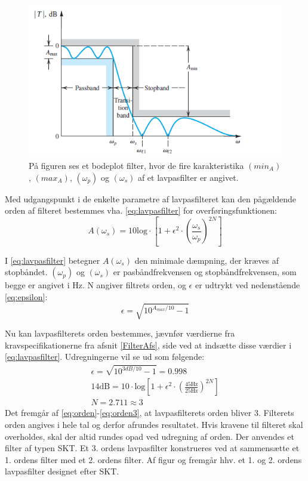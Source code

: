 \begin{figure}[H]
	\centering
	\includegraphics[scale=1]{figures/cProblemloesning/Lavpasfilter_generisk.PNG}
	\caption{På figuren ses et bodeplot filter, hvor de fire karakteristika $(min_{A})$, $(max_{A})$, $(\omega_p)$ og $(\omega_s)$ af et lavpasfilter er angivet. \cite{Carter2013}}
	\label{fig:Lavpasfilter_generisk}
\end{figure}
\noindent Med udgangspunkt i de enkelte parametre af lavpasfilteret kan den pågældende orden af filteret bestemmes vha. \eqref{eq:lavpasfilter} for overføringsfunktionen:
\begin{equation} \label{eq:lavpasfilter}
A(\omega_s) = 10 \text{log} \cdot \left[1 + \epsilon^2 \cdot (\frac{\omega _s}{\omega _p})^{2N}\right] 
\end{equation}

\noindent I \eqref{eq:lavpasfilter} betegner $A(\omega _s)$ den minimale dæmpning, der kræves af stopbåndet. $(\omega_p)$ og $(\omega_s)$ er pasbåndfrekvensen og stopbåndfrekvensen, som begge er angivet i Hz. N angiver filtrets orden, og $\epsilon$ er udtrykt ved nedenstående \eqref{eq:epsilon}:
\begin{equation}\label{eq:epsilon}
\epsilon = \sqrt{10^{A_{max} / 10} -1}
\end{equation}

Nu kan lavpasfilterets orden bestemmes, jævnfør værdierne fra kravspecifikationerne fra afsnit \ref{FilterAfs}, side \pageref{FilterAfs} ved at indsætte disse værdier i \eqref{eq:lavpasfilter}. Udregningerne vil se ud som følgende:
\begin{eqnarray}\label{eq:orden}
\epsilon = \sqrt{10^{3dB /10} -1} = 0.998 \\ 
14\text{dB} = 10 \cdot \text{log} \left[1 + \epsilon ^2 \cdot (\frac{45\text{Hz}}{25\text{Hz}})^{2N}\right] \\
\label{eq:orden3}N = 2.711 \approx 3
\end{eqnarray}
\noindent Det fremgår af \eqref{eq:orden}-\eqref{eq:orden3}, at lavpasfilterets orden bliver $3$. Filterets orden angives i hele tal og derfor afrundes resultatet. Hvis kravene til filteret skal overholdes, skal der altid rundes opad ved udregning af orden. Der anvendes et filter af typen SKT. Et 3. ordens lavpasfilter konstrueres ved at sammensætte et 1. ordens filter med et 2. ordens filter. Af figur  og  fremgår hhv. et 1. og 2. ordens lavpasfilter designet efter SKT. \cite{Carter2013}
	

